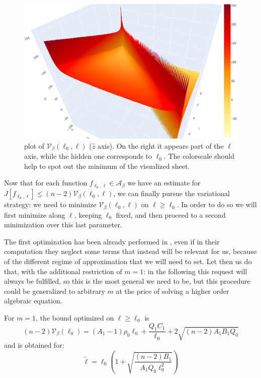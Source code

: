 \begin{figure}
	\includegraphics[scale=0.28]{Immagini/V-beta.png}
	\caption[]{plot of \(\mathcal{V}_{\beta}(\ell_0, \ell)\) (\(\hat{z}\) axis). On the right it appears part of the \(\ell\) axis, while the hidden one corresponds to \(\ell_0\). The colorscale should help to spot out the minimum of the visualized sheet.}
	\label{fig:V-beta}
\end{figure}

Now that for each function \(f_{\ell_0, \ell} \in \mathcal{A}_{\beta}\) we have an estimate for \(J\left[f_{\ell_0, \ell}\right] \le (n-2)\mathcal{V}_{\beta}(\ell_0, \ell)\), we can finally pursue the variational strategy: we need to minimize \(\mathcal{V}_{\beta}(\ell_0, \ell)\) on \(\ell \ge \ell_0\). In order to do so we will first minimize along \(\ell\), keeping \(\ell_0\) fixed, and then proceed to a second minimization over this last parameter.

The first optimization has been already performed in \cite{fewster2020new}, even if in their computation they neglect some terms that instead will be relevant for us, because of the different regime of approximation that we will need to set. Let then us do that, with the additional restriction of \(m = 1\): in the following this request will always be fulfilled, so this is the most general we need to be, but this procedure could be generalized to arbitrary \(m\) at the price of solving a higher order algebraic equation.

\begin{prop}
    For \(m = 1\), the bound optimized on \(\ell \ge \ell_0\) is
    \[
      (n-2)\mathcal{V}_{\beta}(\ell_0) = (A_1 - 1)\rho_0\ell_0 + \frac{Q_1C_1}{\ell_0} + 2 \sqrt{(n - 2)A_1B_1Q_0}   
    \]
    and is obtained for:
    \[
    \tilde{\ell} = \ell_0\left(1 + \sqrt{\frac{(n - 2) B_1}{A_1 Q_0\ell_0^2}}\right)    
    \]
\end{prop}

